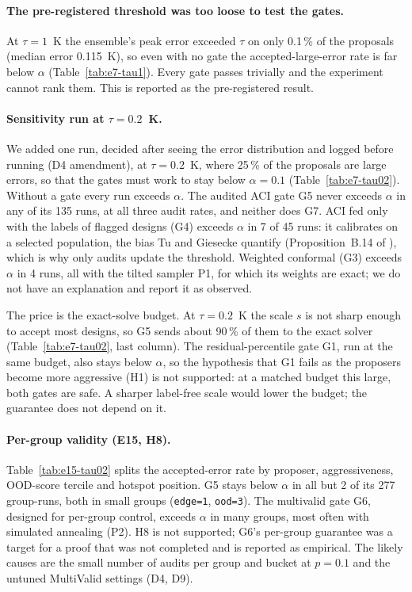 \paragraph{The pre-registered threshold was too loose to test the gates.} At $\tau = 1$~K the
ensemble's peak error exceeded $\tau$ on only 0.1\,\% of the proposals (median error 0.115~K),
so even with no gate the accepted-large-error rate is far below $\alpha$
(Table~\ref{tab:e7-tau1}). Every gate passes trivially and the experiment cannot rank them. This
is reported as the pre-registered result.



\paragraph{Sensitivity run at $\tau = 0.2$~K.} We added one run, decided after seeing the
error distribution and logged before running (D4 amendment), at $\tau = 0.2$~K, where 25\,\% of
the proposals are large errors, so that the gates must work to stay below $\alpha = 0.1$
(Table~\ref{tab:e7-tau02}). Without a gate every run exceeds $\alpha$. The audited ACI gate G5
never exceeds $\alpha$ in any of its 135 runs, at all three audit rates, and neither does G7.
ACI fed only with the labels of flagged designs (G4) exceeds $\alpha$ in 7 of 45 runs: it
calibrates on a selected population, the bias Tu and Giesecke quantify (Proposition~B.14 of
\cite{tu2026}), which is why only audits update the threshold. Weighted conformal (G3) exceeds
$\alpha$ in 4 runs, all with the tilted sampler P1, for which its weights are exact; we do not
have an explanation and report it as observed.



The price is the exact-solve budget. At $\tau = 0.2$~K the scale $s$ is not sharp enough to
accept most designs, so G5 sends about 90\,\% of them to the exact solver
(Table~\ref{tab:e7-tau02}, last column). The residual-percentile gate G1, run at the same budget,
also stays below $\alpha$, so the hypothesis that G1 fails as the proposers become more aggressive
(H1) is not supported: at a matched budget this large, both gates are safe. A sharper
label-free scale would lower the budget; the guarantee does not depend on it.

\paragraph{Per-group validity (E15, H8).} Table~\ref{tab:e15-tau02} splits the accepted-error
rate by proposer, aggressiveness, OOD-score tercile and hotspot position. G5 stays below
$\alpha$ in all but 2 of its 277 group-runs, both in small groups
(\texttt{edge=1}, \texttt{ood=3}). The
multivalid gate G6, designed for per-group control, exceeds $\alpha$ in many groups, most often
with simulated annealing (P2). H8 is not supported; G6's per-group guarantee was a target for a
proof that was not completed and is reported as empirical. The likely causes are the small
number of audits per group and bucket at $p = 0.1$ and the untuned MultiValid settings
(D4, D9).

